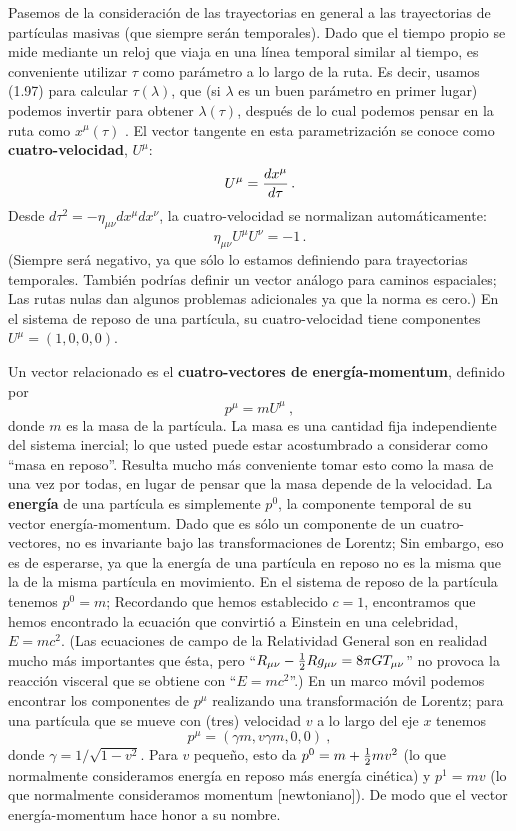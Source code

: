 \documentclass[11pt,b5paper,openany,twoside]{book}
\newcommand{\mn}{{\mu\nu}}
\begin{document}
Pasemos de la consideración de las trayectorias en general a las trayectorias de partículas masivas (que siempre serán temporales).
Dado que el tiempo propio se mide mediante un reloj que viaja en una línea temporal similar al tiempo, es conveniente utilizar $\tau$ como parámetro a lo largo de la ruta.
Es decir, usamos (1.97) para calcular $\tau(\lambda)$, que (si $\lambda$ es un buen parámetro en primer lugar) podemos invertir para obtener $\lambda(\tau)$, después de lo cual podemos pensar en la ruta como $x^\mu(\tau)$ .
El vector tangente en esta parametrización se conoce como {\bf cuatro-velocidad}, $U^\mu$:
\begin{equation}
U^\mu = {{dx^\mu}\over{d\tau}}\,.\label{1.98}
\end{equation}
Desde $d\tau^2 = -\eta_\mn dx^\mu dx^\nu$, la cuatro-velocidad se normalizan automáticamente:
\begin{equation}
\eta_\mn U^\mu U^\nu = -1\,.\label{1.99}
\end{equation}
(Siempre será negativo, ya que sólo lo estamos definiendo para trayectorias temporales.
También podrías definir un vector análogo para caminos espaciales; Las rutas nulas dan algunos problemas adicionales ya que la norma es cero.)
En el sistema de reposo de una partícula, su cuatro-velocidad tiene componentes $U^\mu = (1,0,0,0)$.

Un vector relacionado es el {\bf cuatro-vectores de energía-momentum}, definido por
\begin{equation}
p^\mu = m U^\mu\ ,\label{1.100}
\end{equation}
donde $m$ es la masa de la partícula.
La masa es una cantidad fija independiente del sistema inercial; lo que usted puede estar acostumbrado a considerar como ``masa en reposo''. Resulta mucho más conveniente tomar esto como la masa de una vez por todas, en lugar de pensar que la masa depende de la velocidad.
La {\bf energía} de una partícula es simplemente $p^0$, la componente temporal de su vector energía-momentum.
Dado que es sólo un componente de un cuatro-vectores, no es invariante bajo las transformaciones de Lorentz; Sin embargo, eso es de esperarse, ya que la energía de una partícula en reposo no es la misma que la de la misma partícula en movimiento.
En el sistema de reposo de la partícula tenemos $p^0 =m$; Recordando que hemos establecido $c=1$, encontramos que hemos encontrado la ecuación que convirtió a Einstein en una celebridad, $E=mc^2$.
(Las ecuaciones de campo de la Relatividad General son en realidad mucho más importantes que ésta, pero ``$R_\mn - {1\over 2} Rg_\mn = 8\pi G T_\mn$'' no provoca la reacción visceral que se obtiene con ``$E=mc^2$''.)
En un marco móvil podemos encontrar los componentes de $p^\mu$ realizando una transformación de Lorentz; para una partícula que se mueve con (tres) velocidad $v$ a lo largo del eje $x$ tenemos
\begin{equation}
p^\mu = (\gamma m, v\gamma m, 0 ,0)\ ,\label{1.101}
\end{equation}
donde $\gamma = 1/\sqrt{1-v^2}$.
Para $v$ pequeño, esto da $p^0 = m+{1\over 2}mv^2$ (lo que normalmente consideramos energía en reposo más energía cinética) y $p^1 = mv$ (lo que normalmente consideramos momentum [newtoniano]).
De modo que el vector energía-momentum hace honor a su nombre.
\end{document}
